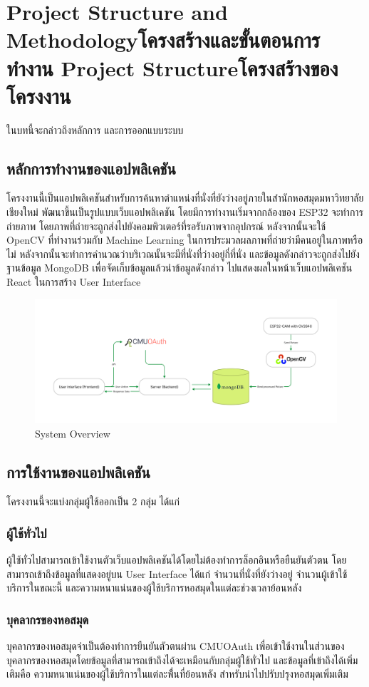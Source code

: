 \chapter{\ifproject%
\ifenglish Project Structure and Methodology\else โครงสร้างและขั้นตอนการทำงาน\fi
\else%
\ifenglish Project Structure\else โครงสร้างของโครงงาน\fi
\fi
}

ในบทนี้จะกล่าวถึงหลักการ และการออกแบบระบบ

\section{หลักการทำงานของแอปพลิเคชัน}
โครงงานนี้เป็นแอปพลิเคชันสำหรับการค้นหาตำแหน่งที่นั่งที่ยังว่างอยู่ภายในสำนักหอสมุดมหาวิทยาลัยเชียงใหม่ พัฒนาขึ้นเป็นรูปแบบเว็บแอปพลิเคชัน
โดยมีการทำงานเริ่มจากกล้องของ ESP32 จะทำการถ่ายภาพ โดยภาพที่ถ่ายจะถูกส่งไปยังคอมพิวเตอร์ที่รอรับภาพจากอุปกรณ์ หลังจากนั้นจะใช้ OpenCV ที่ทำงานร่วมกับ Machine Learning
ในการประมวลผลภาพที่ถ่ายว่ามีคนอยู่ในภาพหรือไม่ หลังจากนั้นจะทำการคำนวณว่าบริเวณนั้นจะมีที่นั่งที่ว่างอยู่กี่ที่นั่ง และข้อมูลดังกล่าวจะถูกส่งไปยังฐานข้อมูล MongoDB เพื่อจัดเก็บข้อมูลแล้วนำข้อมูลดังกล่าว
ไปแสดงผลในหน้าเว็บแอปพลิเคชัน React ในการสร้าง User Interface
\begin{figure}[h]
\centering
\includegraphics[width=\textwidth]{System Diagram.jpg}
\caption[System Overview]{System Overview}
\label{fig:System}
\end{figure}

\section{การใช้งานของแอปพลิเคชัน}
โครงงานนี้จะแบ่งกลุ่มผู้ใช้ออกเป็น 2 กลุ่ม ได้แก่
\subsection{ผู้ใช้ทั่วไป}
ผู้ใช้ทั่วไปสามารถเข้าใช้งานตัวเว็บแอปพลิเคชันได้โดยไม่ต้องทำการล็อกอินหรือยืนยันตัวตน โดยสามารถเข้าถึงข้อมูลที่แสดงอยู่บน User Interface ได้แก่ จำนวนที่นั่งที่ยังว่างอยู่ จำนวนผู้เข้าใช้บริการในขณะนี้ 
และความหนาแน่นของผู้ใช้บริการหอสมุดในแต่ละช่วงเวลาย้อนหลัง
\subsection{บุคลากรของหอสมุด}
บุคลากรของหอสมุดจำเป็นต้องทำการยืนยันตัวตนผ่าน CMUOAuth เพื่อเข้าใช้งานในส่วนของบุคลากรของหอสมุดโดยข้อมูลที่สามารถเข้าถึงได้จะเหมือนกับกลุ่มผู้ใช้ทั่วไป และข้อมูลที่เข้าถึงได้เพิ่มเติมคือ ความหนาแน่นของผู้ใช้บริการในแต่ละพื่้นที่ย้อนหลัง 
สำหรับนำไปปรับปรุงหอสมุดเพิ่มเติม
